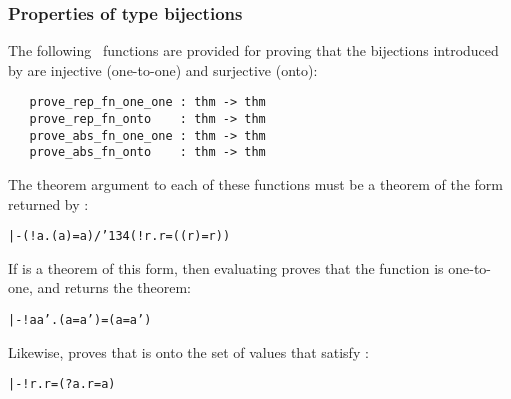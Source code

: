 {\subsubsection{Properties of type bijections}

The following \ML\ functions are provided for proving that the bijections
introduced by  are injective (one-to-one)
and surjective (onto):

\begin{boxed}
\begin{verbatim}
   prove_rep_fn_one_one : thm -> thm
   prove_rep_fn_onto    : thm -> thm
   prove_abs_fn_one_one : thm -> thm
   prove_abs_fn_onto    : thm -> thm
\end{verbatim}\end{boxed}

\noindent The theorem argument to each of these functions must be a theorem 
of the form returned by :

{\def\bk{\char'134}
\begin{hol}\begin{alltt}
   |- (!a. ( a) = a) /\bk (!r.  r = (( r) = r))
\end{alltt}\end{hol}}

\noindent If  is a theorem of this form, then evaluating
 proves that the function  is
one-to-one, and returns the theorem:

\begin{hol}\begin{alltt}
   |- !a a'. ( a =  a') = (a = a')
\end{alltt}\end{hol}

\noindent Likewise,  proves that  is
onto the set of values that satisfy :

{\def\bk{\char'134}
\begin{hol}\begin{alltt}
   |- !r.  r = (?a. r =  a)
\end{alltt}\end{hol}}

}
